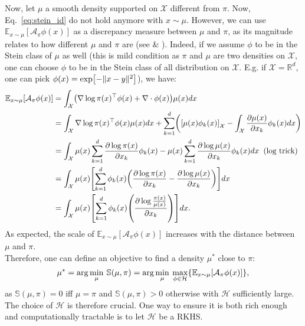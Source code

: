 \documentclass[runningheads,a4paper]{llncs}
\newcommand{\R}{\mathbb{R}}
\newcommand{\E}{\mathbb{E}}
\newcommand{\Sr}{\mathbb{S}}
\newcommand{\X}{\mathcal{X}}
\newcommand{\A}{\mathcal{A}}
\newcommand{\Hr}{\mathcal{H}}
\newcommand{\diff}[2]{\frac{\partial #1}{\partial #2}}
\DeclarePairedDelimiter{\pare}{(}{)}
\DeclarePairedDelimiter{\bra}{\{}{\}}
\DeclarePairedDelimiter{\sq}{[}{]}
\begin{document}
Now, let $\mu$ a smooth density supported on $\X$ different from $\pi$. Now, Eq.~\ref{eq:stein_id} do not hold
anymore with $x \sim \mu$. However, we can use $\E_{x \sim \mu}[\A_\pi \phi (x)]$ as a discrepancy
measure between $\mu$ and $\pi$, as its magnitude relates to how different $\mu$ and $\pi$ are
(see \cite{https://doi.org/10.48550/arxiv.1608.04471} \& \cite{https://doi.org/10.48550/arxiv.1704.07520}).
Indeed, if we assume $\phi$ to be in the Stein class of $\mu$ as well (this is mild condition as
$\pi$ and $\mu$ are two densities on $\X$, one can choose $\phi$ to be in the Stein class
of all distribution on $\X$. E.g. if $\X = \R^d$, one can pick $\phi(x) = \exp\sq*{-\| x - y \|^2}$),
we have:
\begin{equation}
  \begin{split}
    \E_{x \sim \mu}[\A_\pi \phi (x)] &=
      \int_\X \pare*{ \nabla \log \pi(x)^\top \phi(x) + \nabla \cdot \phi(x) } \mu(x) dx \\
    &= \int_\X \nabla \log \pi(x)^\top \phi(x) \mu(x) dx +
    \sum_{k=1}^d \pare*{ \sq*{\mu(x) \phi_k(x)}_\X - \int_\X \diff{\mu(x)}{x_k} \phi_k(x) dx} \\
    &= \int_\X  \mu(x) \sum_{k=1}^d \diff{\log \pi(x)}{x_k}\phi_k(x) -
    \mu(x) \sum_{k=1}^d \diff{\log \mu(x)}{x_k} \phi_k(x) dx \;\; \text{(log trick)} \\
    &= \int_\X  \mu(x) \sq*{ \sum_{k=1}^d \phi_k(x) \pare*{ \diff{\log \pi(x)}{x_k} - \diff{\log \mu(x)}{x_k}}} dx \\
    &= \int_\X  \mu(x) \sq*{ \sum_{k=1}^d \phi_k(x) \pare*{ \diff{\log \frac{\pi(x)}{\mu(x)}}{x_k}}} dx.
  \end{split}
\end{equation}
As expected, the scale of $\E_{x \sim \mu}[\A_\pi \phi (x)]$ increases with the distance between $\mu$ and $\pi$.\\

Therefore, one can define an objective to find a density $\mu^*$ close to $\pi$:
\begin{equation}
  \mu^* = \arg\min_{\mu} \: \Sr(\mu, \pi) =
    \arg\min_{\mu} \: \max_{\phi \in \Hr} \bra*{ \E_{x \sim \mu}[\A_\pi \phi (x)] },
  \label{eq:stein_obj}
\end{equation}
as $\Sr(\mu, \pi) = 0$ iff $\mu = \pi$ and $\Sr(\mu, \pi) > 0$ otherwise with $\Hr$ sufficiently large.
The choice of $\Hr$ is therefore crucial. One way to ensure it is both rich enough and computationally tractable
is to let $\Hr$ be a RKHS.
\end{document}
